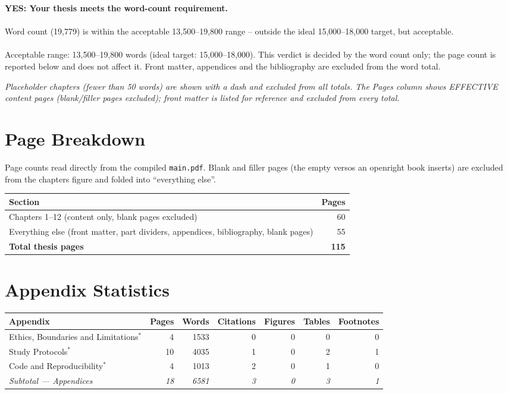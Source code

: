 \documentclass[11pt,a4paper]{article}
\begin{document}
\vspace{1cm}

\noindent
\textbf{YES: Your thesis meets the word-count requirement.}\\\\Word count (19,779) is within the acceptable 13,500--19,800 range -- outside the ideal 15,000--18,000 target, but acceptable.\\\\Acceptable range: 13,500--19,800 words (ideal target: 15,000--18,000). This verdict is decided by the word count only; the page count is reported below and does not affect it. Front matter, appendices and the bibliography are excluded from the word total.


\vspace{0.4cm}

\noindent
\textit{Placeholder chapters (fewer than 50
words) are shown with a dash and excluded from all totals. The Pages
column shows EFFECTIVE content pages (blank/filler pages excluded);
front matter is listed for reference and excluded from every total.}


\section*{Page Breakdown}

\noindent
Page counts read directly from the compiled \texttt{main.pdf}. Blank and
filler pages (the empty versos an openright book inserts) are excluded from
the chapters figure and folded into ``everything else''.

\vspace{0.2cm}

\begin{tabularx}{\textwidth}{Xr}
\toprule
Section & Pages \\
\midrule
Chapters 1--12 (content only, blank pages excluded) & 60 \\
Everything else (front matter, part dividers, appendices, bibliography, blank pages) & 55 \\
\midrule
\textbf{Total thesis pages} & \textbf{115} \\
\bottomrule
\end{tabularx}



\section*{Appendix Statistics}

\begin{tabularx}{\textwidth}{Xrrrrrr}
\toprule
Appendix & Pages & Words & Citations & Figures & Tables & Footnotes \\
\midrule
Ethics, Boundaries and Limitations$^{*}$ & 4 & 1533 & 0 & 0 & 0 & 0 \\
Study Protocols$^{*}$ & 10 & 4035 & 1 & 0 & 2 & 1 \\
Code and Reproducibility$^{*}$ & 4 & 1013 & 2 & 0 & 1 & 0 \\
\midrule
\textit{Subtotal --- Appendices} & \textit{18} & \textit{6581} & \textit{3} & \textit{0} & \textit{3} & \textit{1} \\
\bottomrule
\end{tabularx}
\end{document}
